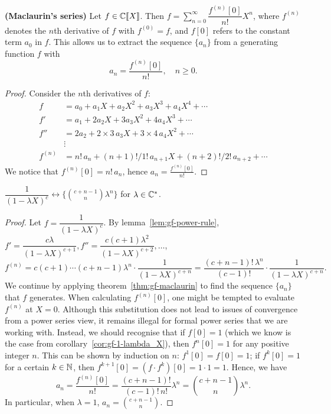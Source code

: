 \documentclass[a4paper, 12pt]{report}
\begin{document}
\begin{thm}\label{thm:gf-maclaurin}
\textbf{(Maclaurin's series)} Let $f \in \mathbb{C}\llbracket X \rrbracket$. Then $f = \sum_{n = 0}^\infty \dfrac{f^{(n)}[0]}{n!} X^n$, where $f^{(n)}$ denotes the $n$th derivative of $f$ with $f^{(0)} = f$, and $f[0]$ refers to the constant term $a_0$ in $f$. This allows us to extract the sequence $\{a_n\}$ from a generating function $f$ with \[a_n = \frac{f^{(n)}[0]}{n!}, \quad n \geq 0.\]
\end{thm}
\begin{proof}
Consider the $n$th derivatives of $f$:
\begin{align*}
f   &= a_0 + a_1 X + a_2 X^2 + a_3 X^3 + a_4 X^4 + \cdots\\
f'  &= a_1 + 2 a_2 X + 3 a_3 X^2 + 4 a_4 X^3 + \cdots\\
f'' &= 2 a_2 + 2 \times 3\,a_3 X + 3 \times 4\,a_4 X^2 + \cdots\\
&\vdots\\
f^{(n)} &= n!\,a_n + (n + 1)! / 1!\,a_{n + 1} X + (n + 2)! / 2!\,a_{n + 2} + \cdots
\end{align*}
We notice that $f^{(n)}[0] = n!\,a_n$, hence $a_n = \frac{f^{(n)}[0]}{n!}$.
\end{proof}

\begin{cor}\label{cor:gf-1-lambdaX-raised-to-c}
$\dfrac{1}{(1 - \lambda X)^c} \longleftrightarrow \{\binom{c + n - 1}{n} \lambda^n\}$ for $\lambda \in \mathbb{C}^*$.
\end{cor}
\begin{proof}
Let $f = \dfrac{1}{(1 - \lambda X)^c}$. By lemma~\ref{lem:gf-power-rule}, $f' = \dfrac{c \lambda}{(1 - \lambda X)^{c + 1}}, f'' = \dfrac{c(c + 1) \lambda^2}{(1 - \lambda X)^{c + 2}}, \dots$, 
\[
f^{(n)} 
= c (c + 1) \cdots (c + n - 1) \lambda^n \cdot \dfrac{1}{(1 - \lambda X)^{c + n}}
= \dfrac{(c + n - 1)!\,\lambda^n}{(c - 1)!} \cdot \dfrac{1}{(1 - \lambda X)^{c + n}}
.
\]
We continue by applying theorem~\ref{thm:gf-maclaurin} to find the sequence $\{a_n\}$ that $f$ generates. When calculating $f^{(n)}[0]$, one might be tempted to evaluate $f^{(n)}$ at $X = 0$. Although this substitution does not lead to issues of convergence from a power series view, it remains illegal for formal power series that we are working with. Instead, we should recognise that if $f[0] = 1$ (which we know is the case from corollary~\ref{cor:gf-1-lambda_X}), then $f^n[0] = 1$ for any positive integer $n$. This can be shown by induction on $n$: $f^1[0] = f[0] = 1$; if $f^k[0] = 1$ for a certain $k \in \mathbb{N}$, then $f^{k + 1}[0] = (f \cdot f^k)[0] = 1 \cdot 1 = 1$. Hence, we have 
\[a_n = \frac{f^{(n)}[0]}{n!} = \dfrac{(c + n - 1)!}{(c - 1)!\,n!} \lambda^n = \binom{c + n - 1}{n} \lambda^n.\]
In particular, when $\lambda = 1$, $a_n = \binom{c + n - 1}{n}$.
\end{proof}
\end{document}

